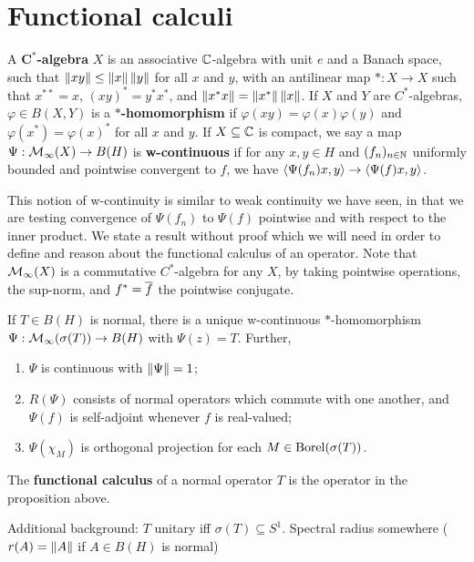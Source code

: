\documentclass[10pt]{amsart}
\begin{document}
\section{Functional calculi}
A \textbf{$\mathbf{C^*}$-algebra} $X$ is an associative $\mathbb{C}$-algebra with unit $e$ and a Banach space, such that $\left\| xy \right\| \leq \left\| x \right\|\left\| y \right\|$ for all $x$ and $y$, with an antilinear map $* : X \to X$ such that $x^{**} = x$, $(xy)^* = y^*x^*$, and $\left\| x^*x \right\| = \left\| x^* \right\|\left\| x \right\|$. If $X$ and $Y$ are $C^*$-algebras, $\varphi \in B(X, Y)$ is a \textbf{$\mathbf{*}$-homomorphism} if $\varphi(xy) = \varphi(x)\varphi(y)$ and $\varphi(x^*) = \varphi(x)^*$ for all $x$ and $y$. %
If $X \subseteq \mathbb{C}$ is compact, we say a map $\Psi : \mathcal{M}_\infty(X) \to B(H)$ is \textbf{w-continuous} if for any $x, y \in H$ and $(f_n)_{n \in \mathbb{N}}$ uniformly bounded and pointwise convergent to $f$, we have $\left\langle \Psi(f_n)x, y \right\rangle \to \left\langle \Psi(f)x, y \right\rangle$.

This notion of w-continuity is similar to weak continuity we have seen, in that we are testing convergence of $\Psi(f_n)$ to $\Psi(f)$ pointwise and with respect to the inner product. We state a result without proof which we will need in order to define and reason about the functional calculus of an operator. Note that $\mathcal{M}_\infty(X)$ is a commutative $C^*$-algebra for any $X$, by taking pointwise operations, the sup-norm, and $f^* = \overline{f}$ the pointwise conjugate.
\begin{proposition}\label{funccalc}
    If $T \in B(H)$ is normal, there is a unique w-continuous $*$-homomorphism $\Psi : \mathcal{M}_\infty(\sigma(T)) \to B(H)$ with $\Psi(z) = T$. Further, 
    \begin{enumerate}
        \item $\Psi$ is continuous with $\left\| \Psi \right\| = 1$;
        \item $R(\Psi)$ consists of normal operators which commute with one another, and $\Psi(f)$ is self-adjoint whenever $f$ is real-valued;
        \item $\Psi(\chi_M)$ is orthogonal projection for each $M \in \operatorname{Borel}(\sigma(T))$.
    \end{enumerate}
\end{proposition}
\begin{definition}
    The \textbf{functional calculus} of a normal operator $T$ is the operator in the proposition above.
\end{definition}
Additional background: $T$ unitary iff $\sigma(T) \subseteq S^1$. Spectral radius somewhere ($r(A) = \left\| A \right\|$ if $A \in B(H)$ is normal)
\end{document}
